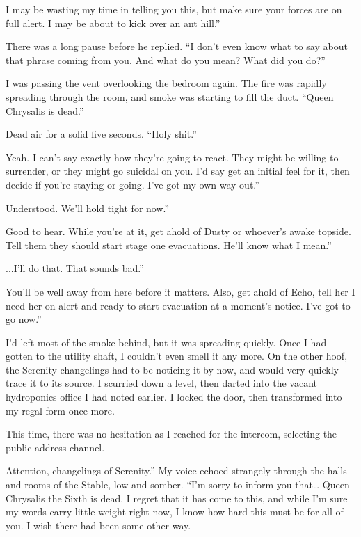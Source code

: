\leavevmode{}I may be wasting my time in telling you this, but make sure your forces are on full alert. I may be about to kick over an ant hill.”

There was a long pause before he replied. “I don’t even know what to say about that phrase coming from you. And what do you mean? What did you do?”

I was passing the vent overlooking the bedroom again. The fire was rapidly spreading through the room, and smoke was starting to fill the duct. “Queen Chrysalis is dead.”

Dead air for a solid five seconds. “Holy shit.”

\leavevmode{}Yeah. I can’t say exactly how they’re going to react. They might be willing to surrender, or they might go suicidal on you. I’d say get an initial feel for it, then decide if you’re staying or going. I’ve got my own way out.”

\leavevmode{}Understood. We’ll hold tight for now.”

\leavevmode{}Good to hear. While you’re at it, get ahold of Dusty or whoever’s awake topside. Tell them they should start stage one evacuations. He’ll know what I mean.”

\leavevmode{}...I’ll do that. That sounds bad.”

\leavevmode{}You’ll be well away from here before it matters. Also, get ahold of Echo, tell her I need her on alert and ready to start evacuation at a moment’s notice. I’ve got to go now.”

I’d left most of the smoke behind, but it was spreading quickly. Once I had gotten to the utility shaft, I couldn’t even smell it any more. On the other hoof, the Serenity changelings had to be noticing it by now, and would very quickly trace it to its source. I scurried down a level, then darted into the vacant hydroponics office I had noted earlier. I locked the door, then transformed into my regal form once more.

This time, there was no hesitation as I reached for the intercom, selecting the public address channel.

\leavevmode{}Attention, changelings of Serenity.” My voice echoed strangely through the halls and rooms of the Stable, low and somber. “I’m sorry to inform you that… Queen Chrysalis the Sixth is dead. I regret that it has come to this, and while I’m sure my words carry little weight right now, I know how hard this must be for all of you. I wish there had been some other way.

